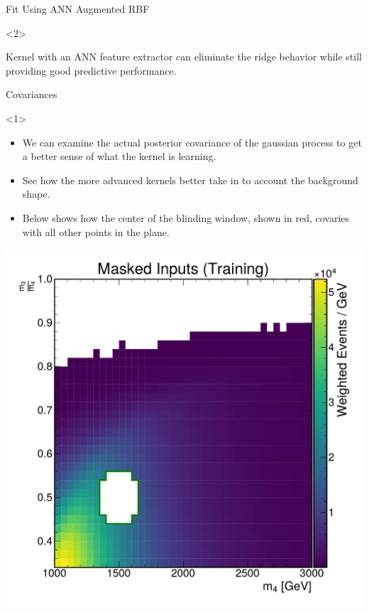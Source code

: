 \documentclass[10pt]{beamer}
\begin{document}
\begin{frame}{Fit Using ANN Augmented RBF}
  \begin{onlyenv}<2>
    \begin{beamerpopover}
      \begin{block}{}
        Kernel with an ANN feature extractor can eliminate the ridge behavior while still providing good predictive performance. 
      \end{block}
    \end{beamerpopover}
  \end{onlyenv}
\end{frame}


\begin{frame}{Covariances}
  \begin{onlyenv}<1>
    \begin{splitcol}[0.65]
      \begin{col}
        \begin{itemize}
        \item We can examine the actual posterior covariance of the gaussian process to get a better sense of what the kernel is learning.
        \item See how the more advanced kernels better take in to account the background shape.
        \item Below shows how the center of the blinding window, shown in red, covaries with all other points in the plane.
        \end{itemize}
      \end{col}
      \begin{col}
        \includegraphics[width=1.0\textwidth]{figures/training_points}

\end{col}
\end{splitcol}
\end{onlyenv}
\end{frame}
\end{document}
